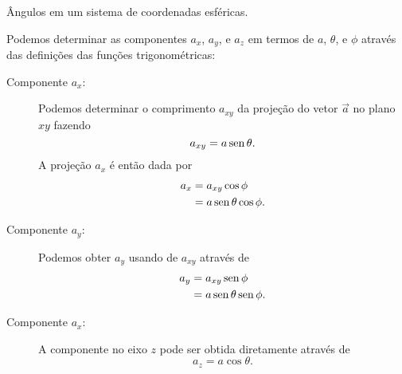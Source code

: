 \begin{marginfigure}[1cm]
\caption{Ângulos em um sistema de coordenadas esféricas.\label{Fig:ExemploVetor3D}}
\end{marginfigure}

Podemos determinar as componentes $a_x$, $a_y$, e $a_z$ em termos de $a$, $\theta$, e $\phi$ através das definições das funções trigonométricas:
\begin{description}
    \item[Componente $a_x$:] Podemos determinar o comprimento $a_{xy}$ da projeção do vetor $\vec{a}$ no plano $xy$ fazendo
    \begin{equation}
        a_{xy} = a \operatorname{sen}\theta.
    \end{equation}
    A projeção $a_x$ é então dada por
    \begin{align}
        a_x &= a_{xy} \cos\phi \\
        &= a \operatorname{sen}\theta\cos\phi.
    \end{align}
    
    \item[Componente $a_y$:] Podemos obter $a_y$ usando de $a_{xy}$ através de
    \begin{align}
        a_y &= a_{xy} \operatorname{sen}\phi \\
        &= a \operatorname{sen}\theta\operatorname{sen}\phi.
    \end{align}
    
    \item[Componente $a_x$:] A componente no eixo $z$ pode ser obtida diretamente através de
    \begin{equation}
        a_z = a \cos \theta.
    \end{equation}
\end{description}

